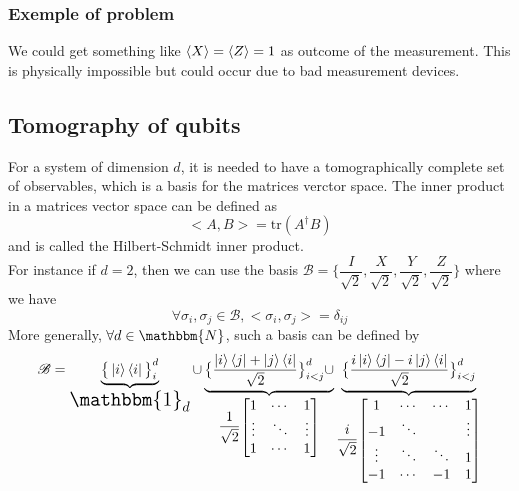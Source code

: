 \documentclass{article}
\begin{document}
\subsubsection*{Exemple of problem}
We could get something like $\braket{X}=\braket{Z}=1$ as outcome of the
measurement. This is physically impossible but could occur due to bad
measurement devices.

\subsection{Tomography of qubits}
For a system of dimension $d$, it is needed to have a tomographically complete
set of observables, which is a basis for the matrices verctor space. The inner
product in a matrices vector space can be defined as
\begin{equation}
    \label{def-h-s-inner-product}
    <A,B> = \text{tr}(A^\dagger B)
\end{equation}
and is called the Hilbert-Schmidt inner product. \\
For instance if $d=2$, then we can use the basis
$\mathscr{B}=\Big\{\dfrac{I}{\sqrt 2}, \dfrac{X}{\sqrt 2}, \dfrac{Y}{\sqrt 2},
\dfrac{Z}{\sqrt 2}\Big\}$ where we have
\begin{equation}
    \forall \sigma_i, \sigma_j \in \mathscr{B}, <\sigma_i, \sigma_j> = \delta_{ij}
\end{equation}
More generally, $\forall d \in \mathbbm{N}$, such a basis can be defined by
\begin{equation}
    \mathscr{B} =
        \underbrace{
            \big\{\ket{i}\bra{i}\big\}_i^d
        }_{
            \text{\Large$\mathbbm{1}_d$}
        } \cup
        \underbrace{
            \big\{\frac{\ket{i}\bra{j} + \ket{j}\bra{i}}{\sqrt 2}\big\}_{i<j}^d\cup
        }_{
            \dfrac{1}{\sqrt2}
            \begin{bmatrix}
                1 & \cdots & 1 \\
                \vdots & \ddots & \vdots \\
                1 & \cdots & 1
            \end{bmatrix}
        }
        \underbrace{
            \big\{\frac{i\ket{i}\bra{j} - i\ket{j}\bra{i}}{\sqrt 2}\big\}_{i<j}^d
        }_{
            \dfrac{i}{\sqrt2}
            \begin{bmatrix}
                1 & \cdots & \cdots & 1 \\
                -1 & \ddots & & \vdots \\
                \vdots & \ddots & \ddots & 1 \\
                -1 & \cdots & -1 & 1
            \end{bmatrix}
        }
\end{equation}
\end{document}
